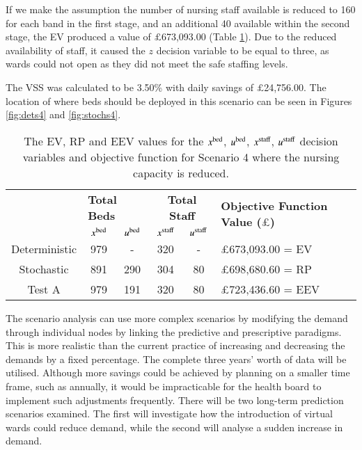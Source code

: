 \documentclass[../thesis.tex]{subfiles}
\begin{document}
If we make the assumption the number of nursing staff available is reduced to 160 for each band in the first stage, and an additional 40 available within the second stage, the EV produced a value of $\pounds$673,093.00 (Table \ref{tab:Scenario4Results}). Due to the reduced availability of staff, it caused the $z$ decision variable to be equal to three, as wards could not open as they did not meet the safe staffing levels. 

The VSS was calculated to be 3.50\% with daily savings of $\pounds$24,756.00. The location of where beds should be deployed in this scenario can be seen in Figures \ref{fig:dets4} and \ref{fig:stochs4}.

\begin{table}[h!]
    \centering
    \begin{tabular}{cccccl}\toprule
 & \multicolumn{2}{l}{\textbf{Total Beds}} & \multicolumn{2}{c}{\textbf{Total Staff}} & \multirow{2}{*}{\textbf{Objective Function Value ($\pounds$)}}\\ \cmidrule(lr){2-3} \cmidrule(lr){4-5}
         
 & $x^\textnormal{bed}$           & $u^\textnormal{bed}$          & $x^\textnormal{staff}$         & $u^\textnormal{staff}$         \\ \midrule
 Deterministic & 979 & - &  320& - &$\pounds$673,093.00 = EV \\
 Stochastic & 891 & 290 & 304 & 80 & $\pounds$698,680.60 = RP \\
 Test A & 979 & 191 & 320 & 80 & $\pounds$723,436.60 = EEV \\\bottomrule
    \end{tabular}
    \caption{The EV, RP and EEV values for the $x^\textnormal{bed}$, $u^\textnormal{bed}$, $x^\textnormal{staff}$, $u^\textnormal{staff}$ decision variables and objective function for Scenario 4 where the nursing capacity is reduced.}
    \label{tab:Scenario4Results}
\end{table}

The scenario analysis can use more complex scenarios by modifying the demand through individual nodes by linking the predictive and prescriptive paradigms. This is more realistic than the current practice of increasing and decreasing the demands by a fixed percentage. The complete three years' worth of data will be utilised. Although more savings could be achieved by planning on a smaller time frame, such as annually, it would be impracticable for the health board to implement such adjustments frequently. There will be two long-term prediction scenarios examined. The first will investigate how the introduction of virtual wards could reduce demand, while the second will analyse a sudden increase in demand.
\end{document}
